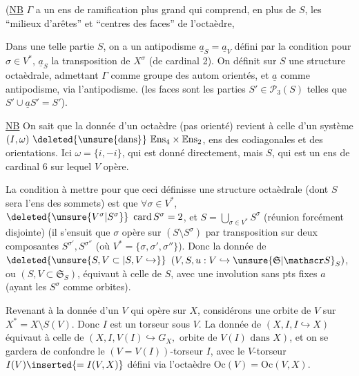 (\uline{NB} $\Gamma$ a un ens de ramification plus grand qui comprend, en plus de $S$, les ``milieux d'arêtes'' et ``centres des faces'' de l'octaèdre,

Dans une telle partie $S$, on a un antipodisme $\underline{a}_S=\underline{a}_V$ défini par la condition  pour $\sigma\in V^*$, $\underline{a}_S$   la transposition de $X^\sigma$ (de cardinal 2). On définit sur $S$ une structure octaèdrale, admettant $\Gamma$ comme groupe des autom orientés, et $\underline a$ comme antipodisme, via l'antipodisme. (les faces sont les parties $S'\in\mathcal{P}_3(S)$ telles que $S'\cup\underline a S'=S'$).


\uline{NB} On sait que la donnée d'un octaèdre  (pas orienté) revient à celle d'un système $(I,\omega)\ \deleted{\unsure{\text{dans}}}\ \mathbb{E}\mathrm{ns}_4\times\mathbb{E}\mathrm{ns}_2$, ens des codiagonales et des orientations. Ici $\omega=\{i,-i\}$,   qui est donné directement, mais $S$, qui est un ens de  cardinal 6 sur lequel $V$ opère.

La condition à mettre  pour que ceci définisse une  structure octaèdrale (dont $S$ sera l'ens des sommets) est que $\forall\sigma\in V^*$, $\deleted{\unsure{V^\sigma|S^\sigma}}\ \operatorname{card}S^\sigma=2$, et $S=\bigcup_{\sigma\in V^*}S^\sigma$ (réunion forcément disjointe) (il s'ensuit que $\sigma$ opère sur $(S\setminus S^\sigma)$ par transposition sur  deux composantes $S^{\sigma'},S^{\sigma''}$ (où $V^*=\{\sigma,\sigma',\sigma''\}$). Donc la donnée de $\deleted{\unsure{S,V\subset|S,V\hookrightarrow}}$ $(V,S,u:V\hookrightarrow\unsure{\mathfrak S|\mathscr S}_S)$, ou $(S,V\subset\mathfrak S_S)$, équivaut à celle de $S$, avec une involution sans pts fixes $a$ (ayant les $S^\sigma$ comme orbites).

Revenant à la donnée d'un $V$ qui opère  sur $X$, considérons une orbite  de $V$ sur $X^*=X\setminus S(V)$. Donc $I$ est un torseur sous $V$. La donnée de $(X,I,I\hookrightarrow X)$ équivaut à celle de $(X,I,V(I)\hookrightarrow G_X,\text{ orbite de }V(I)\text{ dans }X)$, et on se gardera de confondre le $(V=V(I))$-torseur $I$, avec le $V$-torseur $I(V)\inserted{=I(V,X)}$ défini via l'octaèdre $\mathrm{Oc}(V)=\mathrm{Oc}(V,X)$.

